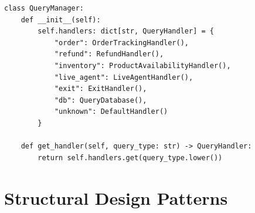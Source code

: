 \documentclass[11pt]{article}
\begin{document}
\begin{lstlisting}
class QueryManager:
    def __init__(self):
        self.handlers: dict[str, QueryHandler] = {
            "order": OrderTrackingHandler(),
            "refund": RefundHandler(),
            "inventory": ProductAvailabilityHandler(),
            "live_agent": LiveAgentHandler(),
            "exit": ExitHandler(),
            "db": QueryDatabase(),
            "unknown": DefaultHandler()
        }

    def get_handler(self, query_type: str) -> QueryHandler:
        return self.handlers.get(query_type.lower())
\end{lstlisting}
%
\section{Structural Design Patterns}
\end{document}
